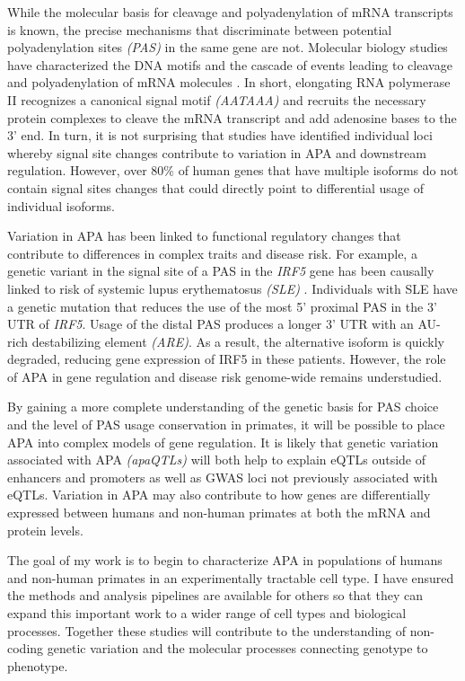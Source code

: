 While the molecular basis for cleavage and polyadenylation of mRNA transcripts is known, the precise mechanisms that discriminate between potential polyadenylation sites \emph{(PAS)} in the same gene are not. Molecular biology studies have characterized the DNA motifs and the cascade of events leading to cleavage and polyadenylation of mRNA molecules \citep{takagaki_four_1989, colgan_mechanism_1997, macdonald_64-kilodalton_1994}. In short, elongating RNA polymerase II recognizes a canonical signal motif \emph{(AATAAA)} and recruits the necessary protein complexes to cleave the mRNA transcript and add adenosine bases to the 3' end. In turn, it is not surprising that studies have identified individual loci whereby signal site changes contribute to variation in APA and downstream regulation. However, over 80\% of human genes that have multiple isoforms do not contain signal sites changes that could directly point to differential usage of individual isoforms.

Variation in APA has been linked to functional regulatory changes that contribute to differences in complex traits and disease risk. For example, a genetic variant in the signal site of a PAS in the \emph{IRF5} gene has been causally linked to risk of systemic lupus erythematosus \emph{(SLE)} \citep{graham_three_2007}. Individuals with SLE have a genetic mutation that reduces the use of the most 5' proximal PAS in the 3' UTR of \emph{IRF5}. Usage of the distal PAS produces a longer 3' UTR with an AU-rich destabilizing element \emph{(ARE)}. As a result, the alternative isoform is quickly degraded, reducing gene expression of IRF5 in these patients. However, the role of APA in gene regulation and disease risk genome-wide remains understudied.

By gaining a more complete understanding of the genetic basis for PAS choice and the level of PAS usage conservation in primates, it will be possible to place APA into complex models of gene regulation. It is likely that genetic variation associated with APA \emph{(apaQTLs)} will both help to explain eQTLs outside of enhancers and promoters as well as GWAS loci not previously associated with eQTLs. Variation in APA may also contribute to how genes are differentially expressed between humans and non-human primates at both the mRNA and protein levels.

The goal of my work is to begin to characterize APA in populations of humans and non-human primates in an experimentally tractable cell type. I have ensured the methods and analysis pipelines are available for others so that they can expand this important work to a wider range of cell types and biological processes. Together these studies will contribute to the understanding of non-coding genetic variation and the molecular processes connecting genotype to phenotype.


